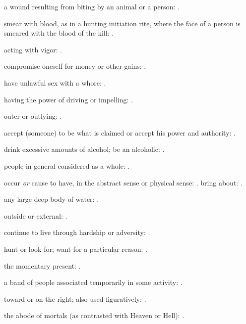   a wound resulting from biting by an animal or a person: .

  smear with blood, as in a hunting initiation rite, where the face of a person is smeared with the blood of the kill: .

  acting with vigor: .

  compromise oneself for money or other gains: .

  have unlawful sex with a whore: .

  having the power of driving or impelling:   .

  outer or outlying: .

  accept (someone) to be what is claimed or accept his power and authority:   .

  drink excessive amounts of alcohol; be an alcoholic:   .

  people in general considered as a whole:   .

  occur \textit{or} cause to have, in the abstract sense or physical sense: . bring about:   .

  any large deep body of water: .

  outside or external: .

  continue to live through hardship or adversity:   .

  hunt or look for; want for a particular reason: .

  the momentary present: .

  a band of people associated temporarily in some activity:   .

  toward or on the right; also used figuratively: .

  the abode of mortals (as contrasted with Heaven or Hell): .

